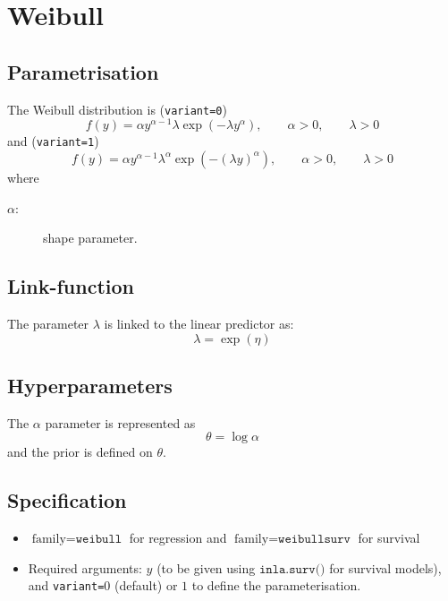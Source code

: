 \documentclass[a4paper,11pt]{article}
\begin{document}
\section*{Weibull}

\subsection*{Parametrisation}

The Weibull distribution is (\texttt{variant=0})
\begin{displaymath}
    f(y) = \alpha y^{\alpha-1}
    \lambda\exp( - \lambda  y^{\alpha}),
    \qquad \alpha>0, \qquad \lambda>0
\end{displaymath}
and (\texttt{variant=1})
\begin{displaymath}
    f(y) = \alpha y^{\alpha-1}
    \lambda^{\alpha}\exp( - (\lambda  y)^{\alpha}),
    \qquad \alpha>0, \qquad \lambda>0
\end{displaymath}
where
\begin{description}
\item[$\alpha$:] shape parameter.
\end{description}

\subsection*{Link-function}

The parameter $\lambda$ is linked to the linear predictor as:
\[
    \lambda = \exp(\eta)
\]
\subsection*{Hyperparameters}

The $\alpha$ parameter is represented as
\[
    \theta = \log\alpha
\]
and the prior is defined on $\theta$.

\subsection*{Specification}

\begin{itemize}
\item $\text{family}=\texttt{weibull}$ for regression and
 $\text{family}=\texttt{weibullsurv}$ for survival
\item Required arguments: $y$ (to be given using
    $\texttt{inla.surv()}$ for survival models), and
    \texttt{variant=}$0$ (default) or $1$ to define the
    parameterisation.
\end{itemize}
\end{document}
